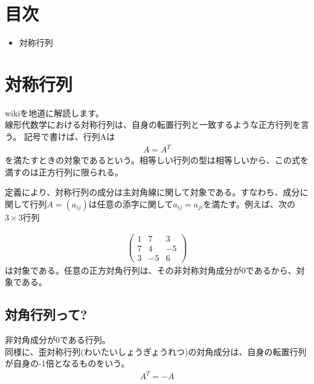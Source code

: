 \section{目次}
 \begin{itemize}
  \item 対称行列
 \end{itemize}

 \section{対称行列}
 wikiを地道に解読します。\\
 線形代数学における対称行列は、自身の転置行列と一致するような正方行列を言う。
 記号で書けば、行列Aは
 \begin{eqnarray}
  A = A^T 
 \end{eqnarray}
 を満たすときの対象であるという。相等しい行列の型は相等しいから、この式を満すのは正方行列に限られる。

 定義により、対称行列の成分は主対角線に関して対象である。すなわち、成分に関して行列$A=(a_{ij})$は任意の添字に関して$a_{ij} = a_{ji}$を満たす。例えば、次の$3 \times 3$行列

 \begin{eqnarray}
  \left(
   \begin{matrix}
	1&7&3\\
	7&4&-5\\
	3&-5&6
   \end{matrix}
   \right)
 \end{eqnarray}
は対象である。任意の正方対角行列は、その非対称対角成分が0であるから、対象である。


\subsection{対角行列って?}
非対角成分が0である行列。\\

同様に、歪対称行列(わいたいしょうぎょうれつ)の対角成分は、自身の転置行列が自身の-1倍となるものをいう。
 \begin{eqnarray}
  A^T = -A 
 \end{eqnarray}
